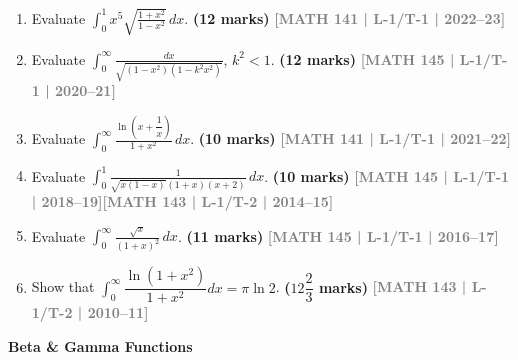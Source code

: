 \documentclass[12pt,a3paper]{article}
\newcommand{\yr}[1]{\hfill\textcolor{gray}{\small\textbf{[#1]}}}
\newcommand{\mk}[1]{\textcolor{orange!70!black}{\small\textbf{(#1 marks)}}}
\newcommand{\subtopic}[2]{%
  \vspace{10pt}
  \noindent\begin{tcolorbox}[colback=#1!8,colframe=#1,boxrule=0.6pt,arc=4pt,
    left=6pt,right=6pt,top=4pt,bottom=4pt]
    \small\bfseries\textcolor{#1}{#2}
  \end{tcolorbox}
  \vspace{2pt}
}
\begin{document}
\begin{enumerate}
  \item Evaluate $\displaystyle\int_{0}^{1}x^{5}\sqrt{\frac{1+x^{2}}{1-x^{2}}}\,dx$.
\mk{12} \yr{MATH 141 | L-1/T-1 | 2022--23}

  \item Evaluate $\displaystyle\int_{0}^{\infty}\frac{dx}{\sqrt{(1-x^{2})(1-k^{2}x^{2})}}$, $k^{2}<1$.
\mk{12} \yr{MATH 145 | L-1/T-1 | 2020--21}

\item Evaluate $\displaystyle\int_{0}^{\infty}\frac{\ln\!\left(x+\dfrac{1}{x}\right)}{1+x^{2}}\,dx$.
\mk{10} \yr{MATH 141 | L-1/T-1 | 2021--22}

\item Evaluate $\displaystyle\int_{0}^{1}\frac{1}{\sqrt{x(1-x)}{(1+x)(x+2)}}\,dx$.
\mk{10} \yr{MATH 145 | L-1/T-1 | 2018--19}\yr{MATH 143 | L-1/T-2 | 2014--15}

\item Evaluate $\displaystyle\int_{0}^{\infty}\frac{\sqrt{x}}{(1+x)^{2}}\,dx$.
\mk{11} \yr{MATH 145 | L-1/T-1 | 2016--17}

\item Show that $\displaystyle\int_{0}^{\infty}\dfrac{\ln(1+x^2)}{1+x^2}dx=\pi\ln{2}$.
\mk{$12\dfrac{2}{3}$} \yr{MATH 143 | L-1/T-2 | 2010--11}

\end{enumerate}

\subtopic{cB}{Beta \& Gamma Functions}
\label{sub:s2-beta}
\end{document}

